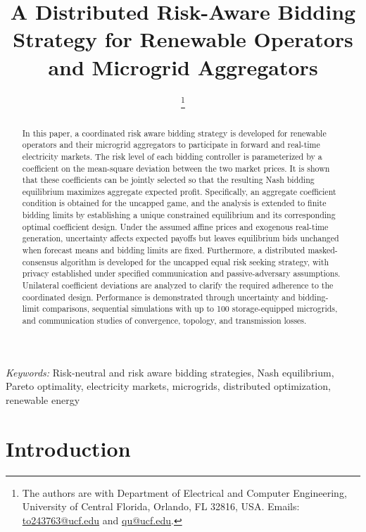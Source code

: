 \documentclass[journal]{IEEEtran}
\title{A Distributed Risk-Aware Bidding Strategy for Renewable Operators and Microgrid Aggregators}
\author{\IEEEauthorblockN{Tommy Truong and Zhihua Qu
}
\thanks{The authors are with Department of Electrical and Computer Engineering, University of Central Florida, Orlando, FL 32816, USA. Emails: \href{mailto:to243763@ucf.edu}{to243763@ucf.edu} and 
\href{mailto:qu@ucf.edu}{qu@ucf.edu}.}}
\begin{document}
\maketitle

\begin{abstract}
In this paper, a coordinated risk aware bidding strategy is developed for renewable operators and their microgrid aggregators to participate in forward and real-time electricity markets. The risk level of each bidding controller is parameterized by a coefficient on the mean-square deviation between the two market prices. It is shown that these coefficients can be jointly selected so that the resulting Nash bidding equilibrium maximizes aggregate expected profit. Specifically, an aggregate coefficient condition is obtained for the uncapped game, and the analysis is extended to finite bidding limits by establishing a unique constrained equilibrium and its corresponding optimal coefficient design. Under the assumed affine prices and exogenous real-time generation, uncertainty affects expected payoffs but leaves equilibrium bids unchanged when forecast means and bidding limits are fixed. Furthermore, a distributed masked-consensus algorithm is developed for the uncapped equal risk seeking strategy, with privacy established under specified communication and passive-adversary assumptions. Unilateral coefficient deviations are analyzed to clarify the required adherence to the coordinated design. Performance is demonstrated through uncertainty and bidding-limit comparisons, sequential simulations with up to 100 storage-equipped microgrids, and communication studies of convergence, topology, and transmission losses.
\end{abstract}

{\it Keywords:} Risk-neutral and risk aware bidding strategies, Nash equilibrium, Pareto optimality, electricity markets, microgrids, distributed optimization, renewable energy

\section{Introduction}
\end{document}

